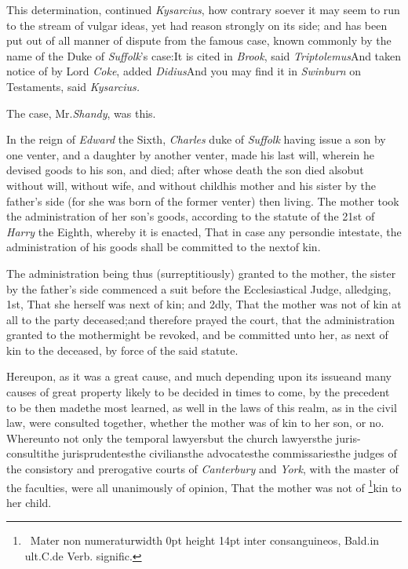 \documentclass{article}
\begin{document}
This determination, continued \textit{Kysarcius}, how
contrary soever it may seem\break
to run to the stream of vulgar ideas,\break
yet had reason strongly on its side; and has been put out of all
manner of dispute from the famous case, known commonly by the name
of the Duke of \textit{Suffolk}’s case:\tsh It is
cited in \textit{Brook}, said \textit{Triptolemus}\tsh And
taken notice of by Lord \textit{Coke}, added \textit{Didius}\tsk And
you may find it in \textit{Swinburn} on Testaments, said
\textit{Kysarcius.}

The case, Mr.\@ \textit{Shandy}, was this.

In the reign of \textit{Edward} the Sixth,\break
\textit{Charles} duke of \textit{Suffolk} having issue a son
by one venter, and a daughter by\break
another venter, made his last will,\break
wherein he devised goods to his son,\break
and died; after whose death the son died also\tsk but
without will, without wife, and without child\tsk his mother and
his sister by the father’s side (for she was born of the
former venter) then living. The mother took the administration of
her son’s goods, according to the statute of the 21st of \textit{Harry} the Eighth, whereby it is
enacted, That in case any person\break die intestate, the administration
of his goods shall be committed to the next\break of kin.

The administration being thus (surreptitiously) granted to the
mother, the sister by the father’s side commenced a suit
before the Ecclesiastical Judge, al\-ledging, 1st, That she herself
was next of kin; and 2dly, That the mother was not of kin at all to
the party deceased;\break and therefore prayed the court, that the
administration granted to the mother\break might be revoked, and be
committed unto her, as next of kin to the deceased, by force of the
said statute.

Hereupon, as it was a great cause, and much depending upon its issue\tsk and many
causes of great property likely to be decided in times to come, by the precedent to
be then made\tsh the most learned, as well in the laws of this realm, as in the
civil law, were consulted together, whether the mother was
of kin to her son, or no.
\tsk Whereunto not only the temporal lawyers\tsk but the church lawyers\tsk the
juris-consulti\tsk the jurisprudentes\tsk the civilians\tsk the advocates\tsk the
commissaries\tsk the judges of the consistory and prerogative courts of
\textit{Canterbury} and \textit{York}, with the master of the faculties, were all
unanimously of opinion, That the mother was not of
\footnote{\ Mater non numeratur\vrule width 0pt height 14pt
inter consanguineos, Bald.\@ in ult.\@ C.\@ de Verb.
signific.}\break kin to her child.\tsh
\end{document}
